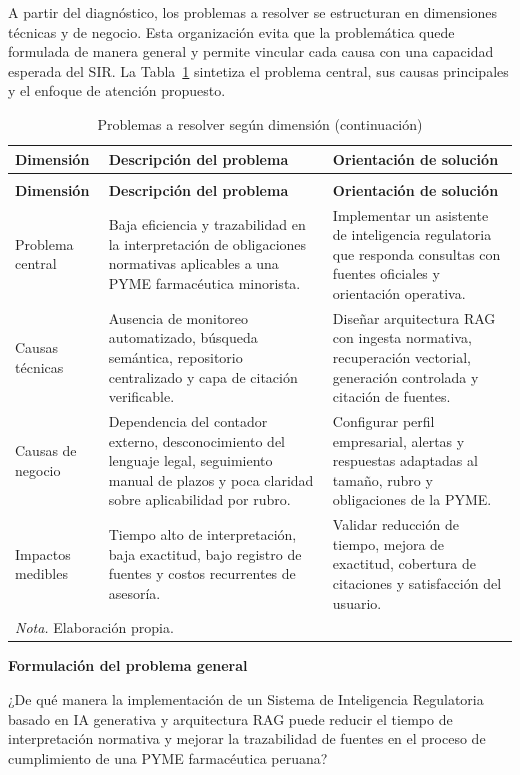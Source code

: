 \documentclass[12pt,a4paper,oneside]{report}
\begin{document}
A partir del diagnóstico, los problemas a resolver se estructuran en dimensiones técnicas y de negocio. Esta organización evita que la problemática quede formulada de manera general y permite vincular cada causa con una capacidad esperada del SIR. La Tabla~\ref{tab:problemas-resolver} sintetiza el problema central, sus causas principales y el enfoque de atención propuesto.

\begin{longtable}{@{}p{}p{}p{}@{}}
\caption{Problemas a resolver según dimensión}\label{tab:problemas-resolver}\\
\toprule
\textbf{Dimensión} & \textbf{Descripción del problema} & \textbf{Orientación de solución} \\
\midrule
\endfirsthead
\caption[]{Problemas a resolver según dimensión (continuación)}\\
\toprule
\textbf{Dimensión} & \textbf{Descripción del problema} & \textbf{Orientación de solución} \\
\midrule
\endhead
Problema central & Baja eficiencia y trazabilidad en la interpretación de obligaciones normativas aplicables a una PYME farmacéutica minorista. & Implementar un asistente de inteligencia regulatoria que responda consultas con fuentes oficiales y orientación operativa. \\
Causas técnicas & Ausencia de monitoreo automatizado, búsqueda semántica, repositorio centralizado y capa de citación verificable. & Diseñar arquitectura RAG con ingesta normativa, recuperación vectorial, generación controlada y citación de fuentes. \\
Causas de negocio & Dependencia del contador externo, desconocimiento del lenguaje legal, seguimiento manual de plazos y poca claridad sobre aplicabilidad por rubro. & Configurar perfil empresarial, alertas y respuestas adaptadas al tamaño, rubro y obligaciones de la PYME. \\
Impactos medibles & Tiempo alto de interpretación, baja exactitud, bajo registro de fuentes y costos recurrentes de asesoría. & Validar reducción de tiempo, mejora de exactitud, cobertura de citaciones y satisfacción del usuario. \\
\bottomrule
\multicolumn{3}{p{0.94\textwidth}}{\normalsize \textit{Nota.} Elaboración propia.}\\
\end{longtable}

\textbf{Formulación del problema general}

¿De qué manera la implementación de un Sistema de Inteligencia Regulatoria basado en IA generativa y arquitectura RAG puede reducir el tiempo de interpretación normativa y mejorar la trazabilidad de fuentes en el proceso de cumplimiento de una PYME farmacéutica peruana?
\end{document}
